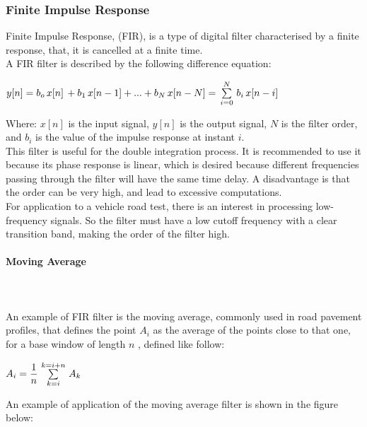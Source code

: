 \documentclass[tesi]{subfiles}
\begin{document}
\subsubsection{Finite Impulse Response} \label{ssc:Finite Impulse Response}
Finite Impulse Response, (FIR), is a type of digital filter characterised by a finite response, that, it is cancelled at a finite time.\\
A FIR filter is described by the following difference equation:

\begin{center}
{\large $y[n] = b_{o} \thinspace x[n] \thinspace  + b_{1} \thinspace  x[n-1] + ... + b_{N} \thinspace  x[n - N] = \thinspace  \sum\limits_{i=0}^{N} \thinspace  b_{i} \thinspace  x[n-i]$}

\end{center}

\noindent Where: 
$x[n]$ is the input signal, $y[n]$ is the output signal, $N$ is the filter order, and $b_{i}$ is the value of the impulse response at instant $i$.\\
This filter is useful for the double integration process. It is recommended to use it because its phase response is linear, which is desired because different frequencies passing through the filter will have the same time delay.
A disadvantage is that the order can be very high, and lead to excessive computations.\\
For application to a vehicle road test, there is an interest in processing low-frequency signals. So the filter must have a low cutoff frequency with a clear transition band, making the order of the filter high. \\

\paragraph{Moving Average}\label{p:moving_average} \leavevmode\\\\
An example of FIR filter is the moving average, commonly used in road pavement profiles, that defines the point $A_{i}$ as the average of the points close to that one, for a base window of length $n$ \cite{little_book}, defined like follow:
\begin{center}
{\large $ A_{i} = \dfrac{1}{n} \thinspace  \sum\limits_{k=i}^{k=i+n} \thinspace  A_{k}$}
\end{center}

\noindent An example of application of the moving average filter is shown in the figure below:
 
\end{document}
